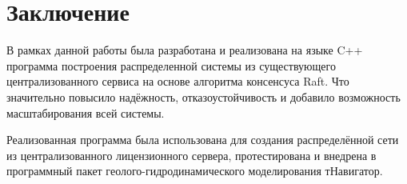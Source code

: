 \documentclass[subf, href, colorlinks=true, 14pt,
times, mtpro, specialist]{disser}
\theoremstyle{definition}
\begin{document}
\newpage
\section{Заключение}

В рамках данной работы была разработана и реализована на языке C++ программа построения распределенной системы из существующего централизованного сервиса на основе алгоритма консенсуса Raft. Что значительно повысило надёжность, отказоустойчивость и добавило возможность масштабирования всей системы.

Реализованная программа была использована для создания распределённой сети из централизованного лицензионного сервера, протестирована и внедрена в программный пакет геолого-гидродинамического моделирования тНавигатор. 



\end{document}
